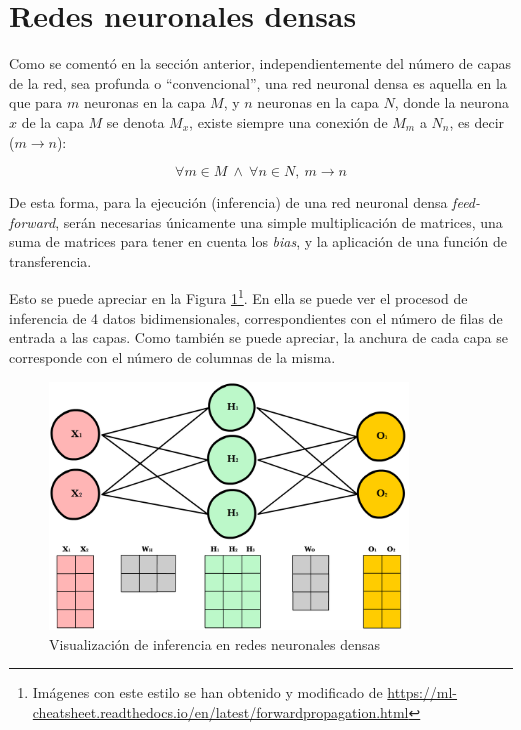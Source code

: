 \section{Redes neuronales densas}
\label{sec:redes_reuronales_densas}
Como se comentó en la sección anterior, independientemente del número de capas de la red, sea profunda o ``convencional'', una red neuronal densa es aquella en la que para $m$ neuronas en la capa $M$, y $n$ neuronas en la capa $N$, donde la neurona $x$ de la capa $M$ se denota $M_{x}$, existe siempre una conexión de $M_{m}$ a $N_{n}$, es decir ($m\longrightarrow n$):

\begin{equation}
\forall m \in M \:\wedge\: \forall n \in N, \: m\longrightarrow n\nonumber
\label{eq:dense_nn}
\end{equation}

De esta forma, para la ejecución (inferencia) de una red neuronal densa \textit{feed-forward}, serán necesarias únicamente una simple multiplicación de matrices, una suma de matrices para tener en cuenta los \textit{bias}, y la aplicación de una función de transferencia.

Esto se puede apreciar en la Figura \ref{fig:nn_matrix_dense}\footnote{Imágenes con este estilo se han obtenido y modificado de \url{https://ml-cheatsheet.readthedocs.io/en/latest/forwardpropagation.html}}. En ella se puede ver el procesod de inferencia de 4 datos bidimensionales, correspondientes con el número de filas de entrada a las capas. Como también se puede apreciar, la anchura de cada capa se corresponde con el número de columnas de la misma. 

\begin{figure}[h!]
    \centering
    \includegraphics[width=0.85\textwidth]{img/neural_network_matrix_dense.png}
    \caption{Visualización de inferencia en redes neuronales densas}
    \label{fig:nn_matrix_dense}
\end{figure}

